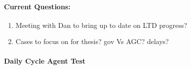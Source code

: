 \documentclass[12pt]{article}
\begin{document}
\begin{multicols}{2}
\begin{enumerate}
\end{enumerate}

	\paragraph{Current Questions:}
	\begin{enumerate}
\itemsep0em 
	\item Meeting with Dan to bring up to date on LTD progress?
	
	\item Cases to focus on for thesis?
	\subitem gov Vs AGC?
	\subitem delays?
	\end{enumerate}
	


\paragraph{Daily Cycle Agent Test} \ \\


\end{multicols}
\end{document}
